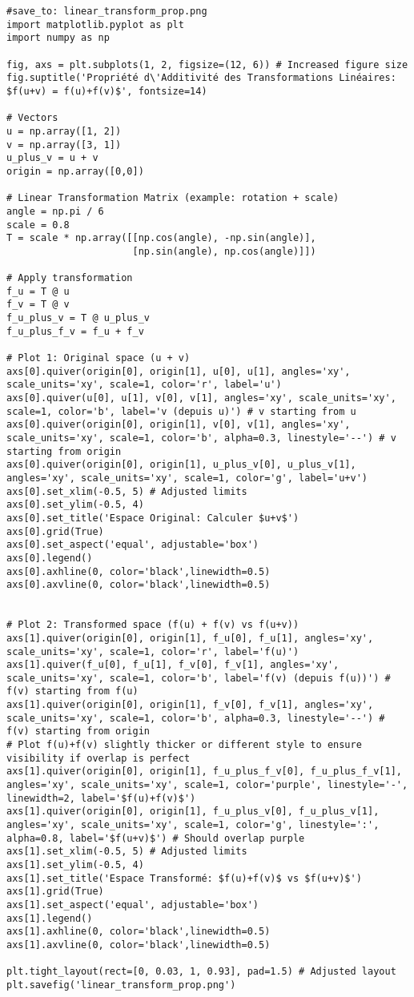 \documentclass{article}
\begin{document}
\begin{verbatim}
#save_to: linear_transform_prop.png
import matplotlib.pyplot as plt
import numpy as np

fig, axs = plt.subplots(1, 2, figsize=(12, 6)) # Increased figure size
fig.suptitle('Propriété d\'Additivité des Transformations Linéaires: $f(u+v) = f(u)+f(v)$', fontsize=14)

# Vectors
u = np.array([1, 2])
v = np.array([3, 1])
u_plus_v = u + v
origin = np.array([0,0])

# Linear Transformation Matrix (example: rotation + scale)
angle = np.pi / 6
scale = 0.8
T = scale * np.array([[np.cos(angle), -np.sin(angle)],
                      [np.sin(angle), np.cos(angle)]])

# Apply transformation
f_u = T @ u
f_v = T @ v
f_u_plus_v = T @ u_plus_v
f_u_plus_f_v = f_u + f_v

# Plot 1: Original space (u + v)
axs[0].quiver(origin[0], origin[1], u[0], u[1], angles='xy', scale_units='xy', scale=1, color='r', label='u')
axs[0].quiver(u[0], u[1], v[0], v[1], angles='xy', scale_units='xy', scale=1, color='b', label='v (depuis u)') # v starting from u
axs[0].quiver(origin[0], origin[1], v[0], v[1], angles='xy', scale_units='xy', scale=1, color='b', alpha=0.3, linestyle='--') # v starting from origin
axs[0].quiver(origin[0], origin[1], u_plus_v[0], u_plus_v[1], angles='xy', scale_units='xy', scale=1, color='g', label='u+v')
axs[0].set_xlim(-0.5, 5) # Adjusted limits
axs[0].set_ylim(-0.5, 4)
axs[0].set_title('Espace Original: Calculer $u+v$')
axs[0].grid(True)
axs[0].set_aspect('equal', adjustable='box')
axs[0].legend()
axs[0].axhline(0, color='black',linewidth=0.5)
axs[0].axvline(0, color='black',linewidth=0.5)


# Plot 2: Transformed space (f(u) + f(v) vs f(u+v))
axs[1].quiver(origin[0], origin[1], f_u[0], f_u[1], angles='xy', scale_units='xy', scale=1, color='r', label='f(u)')
axs[1].quiver(f_u[0], f_u[1], f_v[0], f_v[1], angles='xy', scale_units='xy', scale=1, color='b', label='f(v) (depuis f(u))') # f(v) starting from f(u)
axs[1].quiver(origin[0], origin[1], f_v[0], f_v[1], angles='xy', scale_units='xy', scale=1, color='b', alpha=0.3, linestyle='--') # f(v) starting from origin
# Plot f(u)+f(v) slightly thicker or different style to ensure visibility if overlap is perfect
axs[1].quiver(origin[0], origin[1], f_u_plus_f_v[0], f_u_plus_f_v[1], angles='xy', scale_units='xy', scale=1, color='purple', linestyle='-', linewidth=2, label='$f(u)+f(v)$')
axs[1].quiver(origin[0], origin[1], f_u_plus_v[0], f_u_plus_v[1], angles='xy', scale_units='xy', scale=1, color='g', linestyle=':', alpha=0.8, label='$f(u+v)$') # Should overlap purple
axs[1].set_xlim(-0.5, 5) # Adjusted limits
axs[1].set_ylim(-0.5, 4)
axs[1].set_title('Espace Transformé: $f(u)+f(v)$ vs $f(u+v)$')
axs[1].grid(True)
axs[1].set_aspect('equal', adjustable='box')
axs[1].legend()
axs[1].axhline(0, color='black',linewidth=0.5)
axs[1].axvline(0, color='black',linewidth=0.5)

plt.tight_layout(rect=[0, 0.03, 1, 0.93], pad=1.5) # Adjusted layout
plt.savefig('linear_transform_prop.png')
\end{verbatim}
\end{document}
